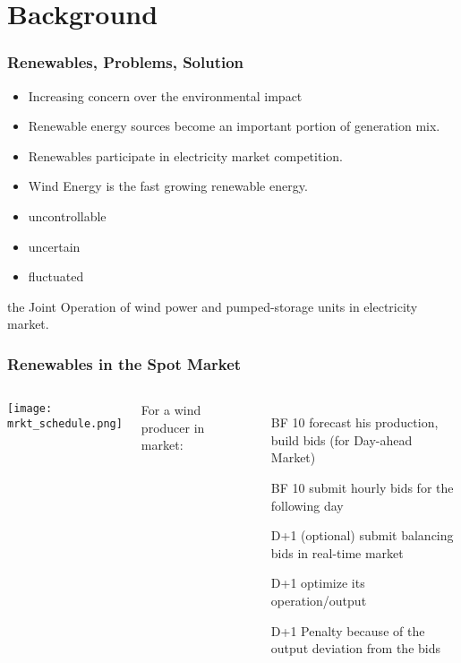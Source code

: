 \section{Background}
\begin{frame}
\frametitle{Renewables, Problems, Solution}
\begin{itemize}
\item Increasing concern over the environmental impact
\item Renewable energy sources become an important portion of generation mix.
\item Renewables participate in electricity market competition.
\item Wind Energy is the fast growing renewable energy.
\end{itemize}
\begin{tcolorbox}[colback=red!5,colframe=red!40!black,title= Drawbacks of Wind]
  \begin{itemize}
  \item uncontrollable
  \item uncertain
  \item fluctuated
  \end{itemize}
\end{tcolorbox}
\begin{tcolorbox}[colback=green!5,colframe=green!40!black,title= Solution]
the Joint Operation of wind power and pumped-storage units in electricity market.
\end{tcolorbox}
\end{frame}
\begin{frame}
\frametitle{Renewables in the Spot Market}
\begin{columns}[c]
   \texttt{[image: mrkt\_schedule.png]}

For a wind producer in market:
  \begin{enumerate}
  \item[BF 10] forecast his production, build bids (for Day-ahead Market)
  \item[BF 10] submit hourly bids for the following day
  \item[D+1] (optional) submit balancing bids in real-time market
  \item[D+1] optimize its operation/output
  \item[D+1] Penalty because of the output deviation from the bids
  \end{enumerate}
\end{columns}
\end{frame}
